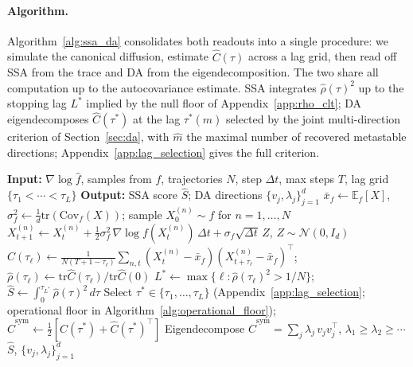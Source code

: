 \documentclass{article}
\newcommand{\E}{\mathbb{E}}
\newcommand{\Cov}{\mathrm{Cov}}
\newcommand{\tr}{\mathrm{tr}}
\begin{document}
\paragraph{Algorithm.}
\label{sec:algorithms}
Algorithm~\ref{alg:ssa_da} consolidates both readouts into a single procedure: we simulate the canonical diffusion, estimate $\hat C(\tau)$ across a lag grid, then read off SSA from the trace and DA from the eigendecomposition. The two share all computation up to the autocovariance estimate. SSA integrates $\hat\rho(\tau)^2$ up to the stopping lag $L^*$ implied by the null floor of Appendix~\ref{app:rho_clt}; DA eigendecomposes $\hat C(\tau^*)$ at the lag $\tau^*(\hat m)$ selected by the joint multi-direction criterion of Section~\ref{sec:da}, with $\hat m$ the maximal number of recovered metastable directions; Appendix~\ref{app:lag_selection} gives the full criterion.

\begin{algorithm}[!htbp]
\caption{SSA and DA from a Score Oracle}
\label{alg:ssa_da}
\begin{algorithmic}[1]
\State \textbf{Input:} $\nabla \log \hat{f}$, samples from $f$, trajectories $N$, step $\Delta t$, max steps $T$, lag grid $\{\tau_1 < \cdots < \tau_L\}$
\State \textbf{Output:} SSA score $\hat S$; DA directions $\{v_j, \lambda_j\}_{j=1}^d$
\State $\bar x_f \gets \E_f[X]$,\; $\sigma_f^2 \gets \tfrac{1}{d}\tr(\Cov_f(X))$;
\State sample $X_0^{(n)} \sim f$ for $n = 1, \ldots, N$
 
    \State $X_{t+1}^{(n)} \gets X_t^{(n)} + \tfrac{1}{2}\sigma_f^2\,\nabla \log f(X_t^{(n)})\,\Delta t + \sigma_f \sqrt{\Delta t}\, Z$, \;\; $Z \sim \mathcal{N}(0, I_d)$
\EndFor
{} 
    \State $\hat C(\tau_\ell) \gets \tfrac{1}{N(T+1-\tau_\ell)} \sum_{n,t} (X_t^{(n)} - \bar x_f)(X_{t+\tau_\ell}^{(n)} - \bar x_f)^\top$;
    \State $\hat\rho(\tau_\ell) \gets \tr \hat C(\tau_\ell)/\tr \hat C(0)$
\EndFor
\State $L^* \gets \max\{\ell : \hat\rho(\tau_\ell)^2 > 1/N\}$;
\State $\hat S \gets \int_0^{\tau_{L^*}} \hat\rho(\tau)^2\,d\tau$ 
\State Select $\tau^* \in \{\tau_1, \ldots, \tau_{L}\}$ (Appendix~\ref{app:lag_selection}; operational floor in Algorithm~\ref{alg:operational_floor});
\State $\hat C^{\mathrm{sym}} \gets \tfrac{1}{2}[\hat C(\tau^*) + \hat C(\tau^*)^\top]$
\State Eigendecompose $\hat C^{\mathrm{sym}} = \sum_j \lambda_j\, v_j v_j^\top$, $\lambda_1 \geq \lambda_2 \geq \cdots$ 
\State \Return $\hat S$,\; $\{v_j, \lambda_j\}_{j=1}^d$
\end{algorithmic}
\end{algorithm}
\end{document}

